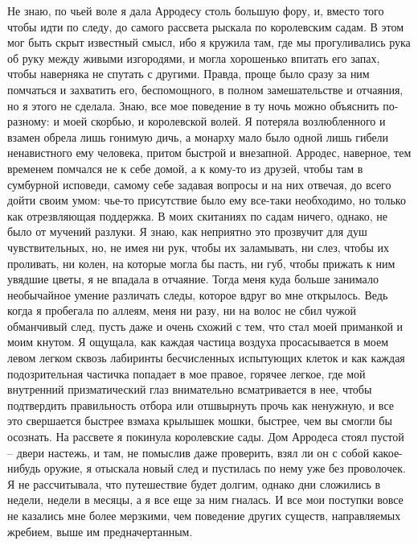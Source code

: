 Не знаю, по чьей воле я дала Арродесу столь  большую  фору,  и,  вместо
того чтобы идти по следу, до самого рассвета рыскала по королевским садам. В
этом мог быть скрыт известный смысл, ибо я кружила там, где мы прогуливались
рука  об руку между живыми изгородями, и могла хорошенько впитать его запах,
чтобы наверняка не спутать с  другими.  Правда,  проще  было  сразу  за  ним
помчаться и захватить его, беспомощного, в полном замешательстве и отчаяния,
но  я  этого  не  сделала. Знаю, все мое поведение в ту ночь можно объяснить
по-разному: и моей скорбью, и королевской волей. Я потеряла возлюбленного  и
взамен  обрела  лишь  гонимую  дичь,  а  монарху мало было одной лишь гибели
ненавистного ему человека, притом быстрой и  внезапной.  Арродес,  наверное,
тем  временем  помчался  не к себе домой, а к кому-то из друзей, чтобы там в
сумбурной исповеди, самому себе задавая вопросы и на них отвечая,  до  всего
дойти своим умом: чье-то присутствие было ему все-таки необходимо, но только
как  отрезвляющая  поддержка.  В  моих скитаниях по садам ничего, однако, не
было от мучений разлуки.  Я  знаю,  как  неприятно  это  прозвучит  для  душ
чувствительных,  но,  не имея ни рук, чтобы их заламывать, ни слез, чтобы их
проливать, ни колен, на которые могла бы пасть, ни губ, чтобы прижать к  ним
увядшие  цветы,  я  не  впадала  в отчаяние. Тогда меня куда больше занимало
необычайное умение различать следы, которое вдруг  во  мне  открылось.  Ведь
когда  я  пробегала  по  аллеям,  меня  ни  разу,  ни на волос не сбил чужой
обманчивый след, пусть даже и очень схожий с тем, что стал моей приманкой  и
моим  кнутом.  Я  ощущала,  как  каждая частица воздуха просасывается в моем
левом легком сквозь лабиринты бесчисленных испытующих клеток  и  как  каждая
подозрительная  частичка  попадает  в  мое  правое,  горячее легкое, где мой
внутренний  призматический  глаз  внимательно  всматривается  в  нее,  чтобы
подтвердить правильность отбора или отшвырнуть прочь как ненужную, и все это
свершается  быстрее  взмаха  крылышек  мошки,  быстрее,  чем  вы  смогли  бы
осознать. На рассвете я покинула королевские сады. Дом Арродеса стоял пустой
-- двери настежь, и там, не помыслив даже проверить,  взял  ли  он  с  собой
какое-нибудь  оружие,  я  отыскала  новый  след  и пустилась по нему уже без
проволочек. Я не рассчитывала, что  путешествие  будет  долгим,  однако  дни
сложились  в  недели, недели в месяцы, а я все еще за ним гналась. И все мои
поступки вовсе не казались мне более мерзкими, чем поведение других существ,
направляемых жребием, выше им предначертанным.


